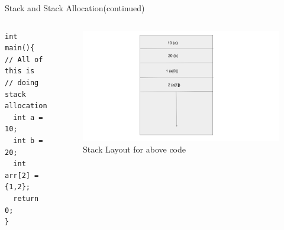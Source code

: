 \documentclass[
  10pt,
  ignorenonframetext,
]{beamer}
\begin{document}
\begin{frame}[fragile]{Stack and Stack
Allocation(continued)}
\protect\hypertarget{stack-and-stack-allocationcontinued}{}
\begin{columns}[T]
\begin{column}{0.4\textwidth}
\vspace{30pt}

\begin{verbatim}
int main(){
// All of this is
// doing stack allocation
  int a = 10;
  int b = 20;
  int arr[2] = {1,2};
  return 0;
}
\end{verbatim}
\end{column}

\begin{column}{0.6\textwidth}
\pause

\begin{figure}
\centering
\includegraphics{images/stack_layout.png}
\caption{Stack Layout for above code}
\end{figure}
\end{column}
\end{columns}
\end{frame}
\end{document}
